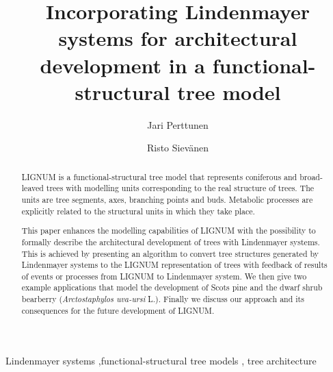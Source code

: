 \documentclass[doublespacing]{elsart}
\begin{document}
\begin{frontmatter}


\title{Incorporating Lindenmayer systems for architectural development
in a functional-structural tree model}
\author[Metla]{Jari Perttunen}
\author[Metla]{Risto Siev\"anen}

\address[Metla]{Vantaa   Research  Centre,  Finnish   Forest  Research
Institute, PL 18,  01301 Vantaa, Finland.}




\begin{abstract}
  LIGNUM  is  a   functional-structural  tree  model  that  represents
  coniferous and broad-leaved trees with modelling units corresponding
  to the real structure of  trees.  The units are tree segments, axes,
  branching  points  and  buds.   Metabolic processes  are  explicitly
  related to the structural units in which they take place.
  
  This paper  enhances the modelling  capabilities of LIGNUM  with the
  possibility  to formally describe  the architectural  development of
  trees with  Lindenmayer systems. This  is achieved by  presenting an
  algorithm  to  convert  tree  structures  generated  by  Lindenmayer
  systems to  the LIGNUM  representation of trees with feedback of results of events or 
  processes from LIGNUM to Lindenmayer system. We then  give two
  example applications  that model the  development of Scots  pine and
  the  dwarf shrub  bearberry  (\textit{Arctostaphylos uva-ursi}  L.).
  Finally we discuss our approach  and its consequences for the future
  development of LIGNUM.

\end{abstract}

\begin{keyword}

 Lindenmayer systems \sep functional-structural tree models \sep 
 tree architecture


\end{keyword}

\end{frontmatter}






\end{document}
